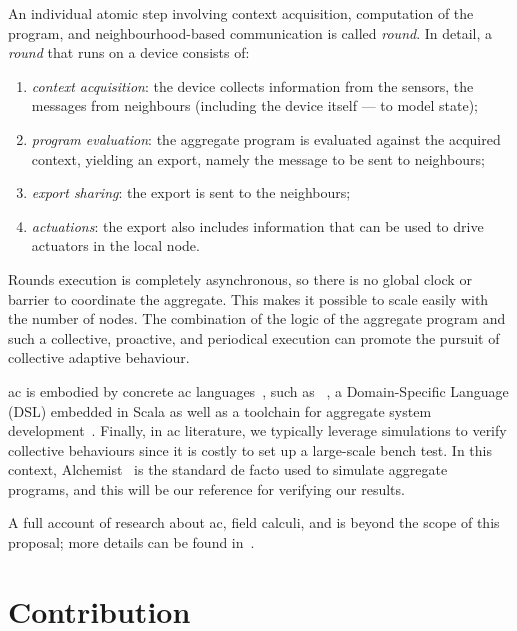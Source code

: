 \documentclass[11pt]{article}
\begin{document}
An individual atomic step involving context acquisition, computation of the program, and neighbourhood-based communication is called \emph{round}.
%
In detail, a \emph{round} that runs on a device consists of:
\begin{enumerate}
  \item \emph{context acquisition}: the device collects information from the sensors, the messages from neighbours (including the device itself --- to model state);
  \item \emph{program evaluation}: the aggregate program is evaluated against the acquired context, yielding an export, namely the message to be sent to neighbours;
  \item \emph{export sharing}: the export is sent to the neighbours;
  \item \emph{actuations}: the export also includes information that can be used to drive actuators in the local node.
\end{enumerate}
%
Rounds execution is completely asynchronous, so there is no global clock or barrier to coordinate the aggregate. 
%
This makes it possible to scale easily with the number of nodes. 
%
The combination of the logic of the aggregate program and such a collective, proactive, and periodical execution can promote the pursuit of collective adaptive behaviour.

\ac{ac} is embodied by concrete \ac{ac} languages~\cite{viroli2019jlamp-si-coord},
 such as \scafi{}~\cite{DBLP:conf/isola/CasadeiVAD20,DBLP:journals/eaai/CasadeiVAPD21},
 a Domain-Specific Language (DSL) embedded in Scala
 as well as a toolchain for aggregate system development~\cite{Casadei2016mass}.
%
Finally, in \ac{ac} literature, we typically leverage simulations to verify collective behaviours since it is costly to set up a large-scale bench test. 
%
In this context, Alchemist~\cite{Pianini_2013} is the standard de facto used to simulate aggregate programs, and this will be our reference for verifying our results.

A full account of research about \ac{ac}, field calculi, and \scafi{} is beyond the scope of this proposal; more details can be found in~\cite{viroli2019jlamp-si-coord,DBLP:journals/eaai/CasadeiVAPD21}.

\section{Contribution} \label{contribution}
\end{document}
